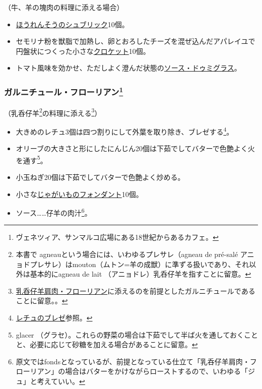 \begin{recette}
（牛、羊の塊肉の料理に添える場合）

\begin{itemize}
\item
  \protect\hyperlink{sucric-d-epinards}{ほうれんそうのシュブリック}10個。
\item
  セモリナ粉を獣脂で加熱し、卵とおろしたチーズを混ぜ込んだアパレイユで円盤状につくった小さな\protect\hyperlink{croquettes}{クロケット}10個。
\item
  トマト風味を効かせ、ただしよく澄んだ状態の\protect\hyperlink{sauce-demi-glace}{ソース・ドゥミグラス}。
\end{itemize}

\hypertarget{garniture-Florian}{%
\subsubsection[ガルニチュール・フローリアン]{\texorpdfstring{ガルニチュール・フローリアン\footnote{ヴェネツィア、サンマルコ広場にある18世紀からあるカフェ。}}{ガルニチュール・フローリアン}}\label{garniture-Florian}}



（乳呑仔羊\footnote{本書で
  agneauという場合には、いわゆるプレサレ（agneau de pré-salé
  アニョドプレサレ）はmouton（ムトン=羊の成獣）に準ずる扱いであり、それ以外は基本的にagneau
  de lait （アニョドレ）乳呑仔羊を指すことに留意。}の料理に添える\footnote{\protect\hyperlink{epaule-d-agneau-florian}{乳呑仔羊肩肉・フローリアン}に添えるのを前提としたガルニチュールであることに留意。。}）

\begin{itemize}
\item
  大きめのレチュ3個は四つ割りにして外葉を取り除き、ブレゼする\footnote{\protect\hyperlink{laitue-braisee}{レチュのブレゼ}参照。}。
\item
  オリーブの大きさと形にしたにんじん20個は下茹でしてバターで色艶よく火を通す\footnote{glacer
    （グラセ）。これらの野菜の場合は下茹でして半ば火を通しておくことと、必要に応じて砂糖を加える場合があることに留意。}。
\item
  小玉ねぎ20個は下茹でしてバターで色艶よく炒める。
\item
  小さな\protect\hyperlink{pommes-de-terre-fondantes}{じゃがいものフォンダント}10個。
\item
  ソース\ldots{}\ldots{}仔羊の肉汁\footnote{原文ではfondsとなっているが、前提となっている仕立て「乳呑仔羊肩肉・フローリアン」の場合はバターをかけながらローストするので、いわゆる「ジュ」と考えていい。}。
\end{itemize}


\end{recette}
